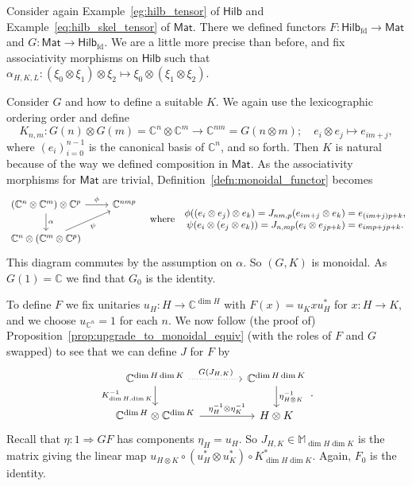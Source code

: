 \documentclass[a4paper,11pt]{article}
\theoremstyle{plain}
\theoremstyle{remark}
\newenvironment{example}
  {\pushQED{\qed}\renewcommand{\qedsymbol}{$\triangle$}\examplex}
  {\popQED\endexamplex}
\newcommand{\catHilb}{\textsf{Hilb}}
\newcommand{\catHilbFD}{\textsf{Hilb}_{\text{fd}}}
\newcommand{\catMat}{\textsf{Mat}}
\begin{document}
\begin{example}
Consider again Example~\ref{eg:hilb_tensor} of $\catHilb$ and Example~\ref{eq:hilb_skel_tensor} of $\catMat$.  There we defined functors $F\colon \catHilbFD \to \catMat$ and $G \colon \catMat \to \catHilbFD$.  We are a little more precise than before, and fix associativity morphisms on $\catHilb$ such that $\alpha_{H,K,L} \colon (\xi_0\otimes\xi_1)\otimes\xi_2 \mapsto \xi_0\otimes(\xi_1\otimes\xi_2)$.

Consider $G$ and how to define a suitable $K$.  We again use the lexicographic ordering order and define
\[ K_{n,m} \colon G(n)\otimes G(m) = \mathbb C^n \otimes \mathbb C^m \to \mathbb C^{nm} = G(n\otimes m); \quad
e_i\otimes e_j \mapsto e_{im+j}, \]
where $(e_i)_{i=0}^{n-1}$ is the canonical basis of $\mathbb C^n$, and so forth.  Then $K$ is natural because of the way we defined composition in $\catMat$.  As the associativity morphisms for $\catMat$ are trivial, Definition~\ref{defn:monoidal_functor} becomes
\[ \begin{tikzcd}
  (\mathbb C^n\otimes\mathbb C^m)\otimes\mathbb C^p \ar[r, "\phi"] \ar[d, "\alpha"] &  \mathbb C^{nmp}  \\
  \mathbb C^n\otimes(\mathbb C^m\otimes\mathbb C^p) \ar[ru, "\psi"']
\end{tikzcd}
\quad\text{where}\quad
\begin{matrix}
\phi((e_i\otimes e_j)\otimes e_k) = J_{nm,p}(e_{im+j}\otimes e_k) = e_{(im+j)p+k},   \\
\psi(e_i\otimes(e_j\otimes e_k)) = J_{n,mp}(e_i\otimes e_{jp+k}) = e_{imp+jp+k}.
\end{matrix} \]
This diagram commutes by the assumption on $\alpha$.  So $(G,K)$ is monoidal.  As $G(1) = \mathbb C$ we find that $G_0$ is the identity.

To define $F$ we fix unitaries $u_H \colon H \to \mathbb C^{\dim H}$ with $F(x) = u_K x u_H^*$ for $x\colon H\to K$, and we choose $u_{\mathbb C^n} = 1$ for each $n$.  We now follow (the proof of) Proposition~\ref{prop:upgrade_to_monoidal_equiv} (with the roles of $F$ and $G$ swapped) to see that we can define $J$ for $F$ by
\[\begin{tikzcd}[column sep=9ex]
  \mathbb C^{\dim H \dim K} \ar[d, "K_{\dim H, \dim K}^{-1}"'] \ar[r, dotted, "G(J_{H,K})"]
   & \mathbb C^{\dim H \dim K} \ar[d, "\eta^{-1}_{H\otimes K}"] \\
  \mathbb C^{\dim H} \otimes \mathbb C^{\dim K} \ar[r, "\eta^{-1}_H\otimes\eta^{-1}_K"] & H\otimes K
\end{tikzcd}. \]
Recall that $\eta \colon 1 \Rightarrow GF$ has components $\eta_H = u_H$.  So $J_{H,K} \in \mathbb M_{\dim H\dim K}$ is the matrix giving the linear map $u_{H\otimes K} \circ (u_H^* \otimes u_K^*) \circ K_{\dim H \dim K}^*$.  Again, $F_0$ is the identity.


\end{example}
\end{document}
